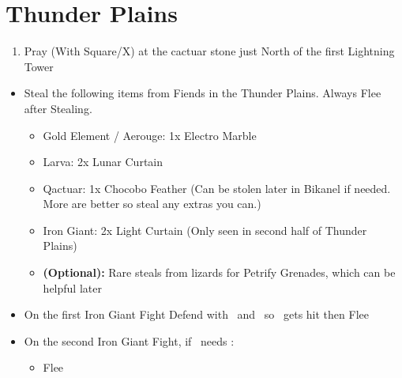 \chapter{Thunder Plains}
\begin{enumerate}
	\item Pray (With Square/X) at the cactuar stone just North of the first Lightning Tower
\end{enumerate}
\begin{encounters}
	\begin{itemize}
		\item Steal the following items from Fiends in the Thunder Plains. Always Flee after Stealing.
		\begin{itemize}
			\item Gold Element / Aerouge: 1x Electro Marble
			\item Larva: 2x Lunar Curtain
			\item Qactuar: 1x Chocobo Feather (Can be stolen later in Bikanel if needed. More are better so steal any extras you can.)
			\item Iron Giant: 2x Light Curtain (Only seen in second half of Thunder Plains)
			\item \textbf{(Optional):} Rare steals from lizards for Petrify Grenades, which can be helpful later
		\end{itemize}
		\vspace{\baselineskip}
		\item On the first Iron Giant Fight Defend with \tidus\ and \auron\ so \rikku\ gets hit then Flee
		\vspace{\baselineskip}
		\item On the second Iron Giant Fight, if \yuna\ needs \od:
			\begin{itemize}
				\switch{\rikku}{\yuna}
				\yunaf attack self
				\tidusf defend
				\switch{\auron}{\rikku}
				\rikkuf steal from Iron Giant
				\item Flee
			\end{itemize}
	\end{itemize}
\end{encounters}
